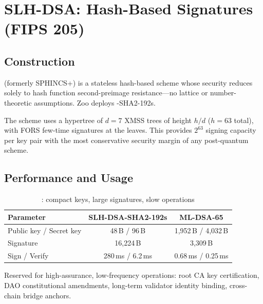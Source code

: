 \section{SLH-DSA: Hash-Based Signatures (FIPS 205)}


\subsection{Construction}

\SLHDSA{} (formerly SPHINCS+) is a stateless hash-based scheme whose security reduces solely to hash function second-preimage resistance---no lattice or number-theoretic assumptions. Zoo deploys \SLHDSA{}-SHA2-192s.

The scheme uses a hypertree of $d = 7$ XMSS trees of height $h/d$ ($h = 63$ total), with FORS few-time signatures at the leaves. This provides $2^{63}$ signing capacity per key pair with the most conservative security margin of any post-quantum scheme.

\subsection{Performance and Usage}

\begin{table}[h]
\centering
\begin{tabular}{lcc}
\toprule
\textbf{Parameter} & \textbf{SLH-DSA-SHA2-192s} & \textbf{ML-DSA-65} \\
\midrule
Public key / Secret key & 48\,B / 96\,B & 1,952\,B / 4,032\,B \\
Signature & 16,224\,B & 3,309\,B \\
Sign / Verify & 280\,ms / 6.2\,ms & 0.68\,ms / 0.25\,ms \\
\bottomrule
\end{tabular}
\caption{\SLHDSA{}: compact keys, large signatures, slow operations}
\label{tab:slhdsa-perf}
\end{table}

Reserved for high-assurance, low-frequency operations: root CA key certification, DAO constitutional amendments, long-term validator identity binding, cross-chain bridge anchors.

